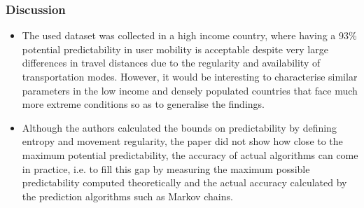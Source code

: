 \subsubsection*{Discussion}
\begin{itemize}

\item The used dataset was collected in a high income country, where having a 93\% potential predictability
in user mobility is acceptable despite very large differences in travel distances due to the regularity 
and availability of transportation modes. However, it would be interesting to characterise similar parameters 
in the low income and densely populated countries that face much more extreme conditions so as to generalise the
findings.  

\item Although the authors calculated the bounds on predictability by defining entropy and movement regularity, 
the paper did not show how close to the maximum potential predictability, the accuracy of actual algorithms can 
come in practice, i.e. to fill this gap by measuring the maximum possible predictability computed theoretically
and the actual accuracy calculated by the prediction algorithms such as Markov chains.   
\end{itemize}